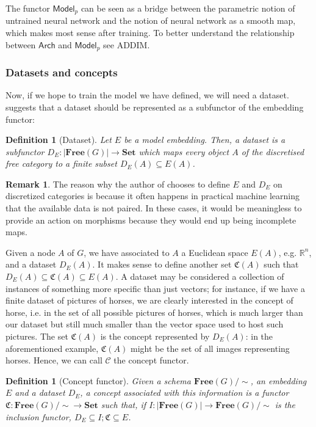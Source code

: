 \documentclass[12pt,a4paper,openright,twoside]{report}
\theoremstyle{plain}
\newtheorem{definition}[proposition]{Definition}
\theoremstyle{definition}
\newtheorem{remark}[proposition]{Remark}
\begin{document}
The functor $\mathsf{Model}_p$ can be seen as a bridge between the parametric notion of untrained neural network and the notion of neural network as a smooth map, which makes most sense after training. To better understand the relationship between $\mathsf{Arch}$ and $\mathsf{Model}_p$ see ADDIM.

\subsubsection{Datasets and concepts}

Now, if we hope to train the model we have defined, we will need a dataset. \cite{gavranovic2019compositional} suggests that a dataset should be represented as a subfunctor of the embedding functor:

\begin{definition}[Dataset]
  Let $E$ be a model embedding. Then, a dataset is a subfunctor $D_E: |\mathbf{Free}(G)| \to \mathbf{Set}$ which maps every object $A$ of the discretised free category to a finite subset $D_E(A) \subseteq E(A)$.
\end{definition}

\begin{remark}
  The reason why the author of \cite{gavranovic2019compositional} chooses to define $E$ and $D_E$ on discretized categories is because it often happens in practical machine learning that the available data is not paired. In these cases, it would be meaningless to provide an action on morphisms because they would end up being incomplete maps.
\end{remark}

Given a node $A$ of $G$, we have associated to $A$ a Euclidean space $E(A)$, e.g. $\mathbb{R}^n$, and a dataset $D_E(A)$. It makes sense to define another set $\mathfrak{C}(A)$ such that $D_E(A) \subseteq \mathfrak{C}(A) \subseteq E(A)$. A dataset may be considered a collection of instances of something more specific than just vectors; for instance, if we have a finite dataset of pictures of horses, we are clearly interested in the concept of horse, i.e. in the set of all possible pictures of horses, which is much larger than our dataset but still much smaller than the vector space used to host such pictures. The set $\mathfrak{C}(A)$ is the concept represented by $D_E(A)$: in the aforementioned example, $\mathfrak{C}(A)$ might be the set of all images representing horses. Hence, we can call $\mathcal{C}$ the concept functor. 

\begin{definition}[Concept functor]
  Given a schema $\mathbf{Free}(G)/{\sim}$, an embedding $E$ and a dataset $D_E$, a concept associated with this information is a functor $\mathfrak{C}: \mathbf{Free}(G)/{\sim} \to \mathbf{Set}$ such that, if $I: |\mathbf{Free}(G)| \to \mathbf{Free}(G)/{\sim}$ is the inclusion functor, $D_E \subseteq I;\mathfrak{C} \subseteq E$.
\end{definition}
\end{document}
